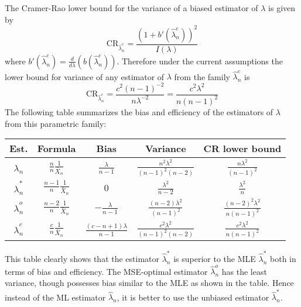 \documentclass[a4paper]{article}
\newcommand{\brac}[1]{\left ( #1 \right )}
\begin{document}
The Cramer-Rao lower bound for the variance of a biased estimator of $\lambda$ is given by \[ \text{CR}_{\hat{\lambda}_n^c} = \frac{\brac{1+b'\brac{\hat{\lambda}_n^c}}^2}{I\brac{\lambda}}\] where $b'({\hat{\lambda}_n^c})= \frac{d}{d\lambda} \brac{b({\hat{\lambda}_n^c})}$. Therefore under the current assumptions the lower bound for variance of any estimator of $\lambda$ from the family $\hat{\lambda}_n^c$ is \[\text{CR}_{\hat{\lambda}_n^c} = \frac{c^2\brac{n-1}^{-2}}{n\lambda^{-2}} = \frac{c^2 \lambda^2}{n\brac{n-1}^2}\] The following table summarizes the bias and efficiency of the estimators of $\lambda$ from this parametric family:
\begin{center}\begin{tabular}{| c | c | c | c | c |}
\hline
	Est. & Formula & Bias & Variance & CR lower bound \\ \hline\hline
	$\hat{\lambda}_n$ & $\frac{n}{n}\frac{1}{\bar{X}_n}$ & $\frac{\lambda}{n-1}$ & $\frac{n^2\lambda^2}{\brac{n-1}^2\brac{n-2}}$ & $\frac{n \lambda^2}{\brac{n-1}^2}$ \\ \hline

	$\hat{\lambda}_n^*$ & $\frac{n-1}{n} \frac{1}{\bar{X}_n}$ & 0 & $\frac{\lambda^2}{n-2}$ & $\frac{\lambda^2}{n}$ \\ \hline

	$\hat{\lambda}_n^o$ & $\frac{n-2}{n} \frac{1}{\bar{X}_n}$ & $-\frac{\lambda}{n-1}$ & $\frac{\brac{n-2}\lambda^2}{\brac{n-1}^2}$ & $\frac{\brac{n-2}^2 \lambda^2}{n \brac{n-1}^2}$ \\ \hline\hline

	$\hat{\lambda}_n^c$ & $\frac{c}{n} \frac{1}{\bar{X}_n}$ & $\frac{\brac{c-n+1}\lambda}{n-1}$ & $\frac{c^2\lambda^2}{\brac{n-1}^2\brac{n-2}}$ & $\frac{c^2 \lambda^2}{n \brac{n-1}^2}$ \\ \hline
\end{tabular}\end{center}
This table clearly shows that the estimator $\hat{\lambda}_n^*$ is superior to the MLE $\hat{\lambda}_n^*$ both in terms of bias and efficiency. The MSE-optimal estimator $\hat{\lambda}_n^o$ has the least variance, though possesses bias similar to the MLE as shown in the table. Hence instead of the ML estimator $\hat{\lambda}_n$, it is better to use the unbiased estimator $\hat{\lambda}_n^*$.

\end{document}
